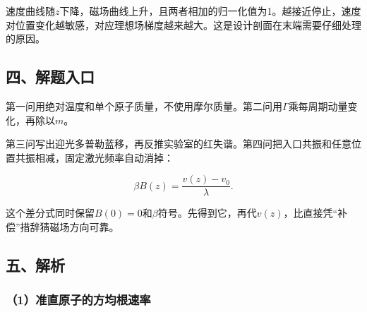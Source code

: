 \documentclass[12pt,a4paper,fontset=fandol]{ctexart}
\begin{document}
\begin{center}
\begin{minipage}{\linewidth}
\centering\begingroup{}
\ifdim\wd\diagrambox>.88\linewidth
\sbox{\diagrambox}{\resizebox{.88\linewidth}{!}{\usebox{\diagrambox}}}\fi
\ifdim\ht\diagrambox>.38\textheight
\resizebox{!}{.38\textheight}{\usebox{\diagrambox}}
\else\usebox{\diagrambox}\fi
\par{}\endgroup\end{minipage}\end{center}

速度曲线随\(z\)下降，磁场曲线上升，且两者相加的归一化值为1。越接近停止，速度对位置变化越敏感，对应理想场梯度越来越大。这是设计剖面在末端需要仔细处理的原因。

\subsection{四、解题入口}\label{ux56dbux89e3ux9898ux5165ux53e3-4}

第一问用绝对温度和单个原子质量，不使用摩尔质量。第二问用\(\Gamma\)乘每周期动量变化，再除以\(m\)。

第三问写出迎光多普勒蓝移，再反推实验室的红失谐。第四问把入口共振和任意位置共振相减，固定激光频率自动消掉：

\[
\beta B(z)=\frac{v(z)-v_0}{\lambda}.
\]

这个差分式同时保留\(B(0)=0\)和\(\beta\)符号。先得到它，再代\(v(z)\)，比直接凭``补偿''措辞猜磁场方向可靠。

\subsection{五、解析}\label{ux4e94ux89e3ux6790-4}

\subsubsection{（1）准直原子的方均根速率}\label{ux51c6ux76f4ux539fux5b50ux7684ux65b9ux5747ux6839ux901fux7387}
\end{document}
